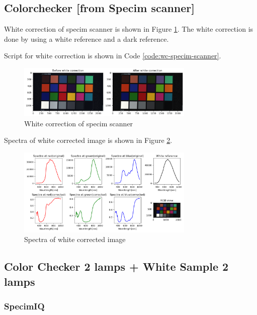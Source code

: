 \subsection{Colorchecker [from Specim scanner]}

White correction of specim scanner is shown in Figure
\ref{fig:wc-specim-scanner}.
The white correction is done by using a white reference and a dark reference.

Script for white correction is shown in Code \ref{code:wc-specim-scanner}.

\begin{figure}[H]
  \centering
  \caption{White correction of specim scanner}
  \label{fig:wc-specim-scanner}
  \includegraphics[width=0.75\textwidth]{
    ./fig-task1/specium-scanner.png
  }
\end{figure}

Spectra of white corrected image is shown in Figure
\ref{fig:wc-specim-scanner-spectra}.

\begin{figure}[H]
  \centering
  \caption{Spectra of white corrected image}
  \label{fig:wc-specim-scanner-spectra}
  \includegraphics[width=0.75\textwidth]{
    ./fig-task1/wc-specim-scanner-spectra.png
  }
\end{figure}

\subsection{Color Checker 2 lamps + White Sample 2 lamps}

\subsubsection{SpecimIQ}

